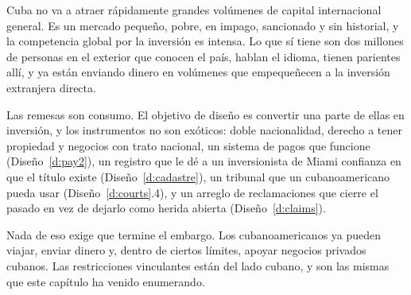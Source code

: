 Cuba no va a atraer rápidamente grandes volúmenes de capital internacional general. Es un mercado
pequeño, pobre, en impago, sancionado y sin historial, y la competencia global por la inversión es
intensa. Lo que sí tiene son dos millones de personas en el exterior que conocen el país, hablan
el idioma, tienen parientes allí, y ya están enviando dinero en volúmenes que empequeñecen a la
inversión extranjera directa.

Las remesas son consumo. El objetivo de diseño es convertir una parte de ellas en inversión, y los
instrumentos no son exóticos: doble nacionalidad, derecho a tener propiedad y negocios con trato
nacional, un sistema de pagos que funcione (Diseño~\ref{d:pay2}), un registro que le dé a un
inversionista de Miami confianza en que el título existe (Diseño~\ref{d:cadastre}), un tribunal que
un cubanoamericano pueda usar (Diseño~\ref{d:courts}.4), y un arreglo de reclamaciones que cierre
el pasado en vez de dejarlo como herida abierta (Diseño~\ref{d:claims}).

Nada de eso exige que termine el embargo. Los cubanoamericanos ya pueden viajar, enviar dinero y,
dentro de ciertos límites, apoyar negocios privados cubanos. Las restricciones vinculantes están
del lado cubano, y son las mismas que este capítulo ha venido enumerando.
